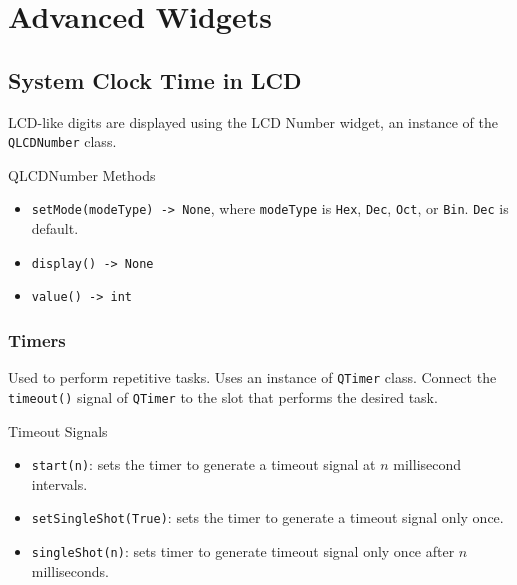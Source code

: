 \documentclass[notes.tex]{subfiles}
\begin{document}
	\chapter{Advanced Widgets}
		\section{System Clock Time in LCD}
			LCD-like digits are displayed using the LCD Number widget, an instance of the \verb|QLCDNumber| class.
			\begin{sidenote}{QLCDNumber Methods}
				\begin{itemize}[nosep]
					\item \verb|setMode(modeType) -> None|, where \verb|modeType| is \verb|Hex|, \verb|Dec|, \verb|Oct|, or \verb|Bin|. \verb|Dec| is default.
					\item \verb|display() -> None|
					\item \verb|value() -> int|
				\end{itemize}
			\end{sidenote}

			\subsection{Timers}
				Used to perform repetitive tasks. Uses an instance of \verb|QTimer| class. Connect the \verb|timeout()| signal of \verb|QTimer| to the slot that performs the desired task.
				\begin{sidenote}{Timeout Signals}
					\begin{itemize}[nosep]
						\item \verb|start(n)|: sets the timer to generate a timeout signal at $n$ millisecond intervals.
						\item \verb|setSingleShot(True)|: sets the timer to generate a timeout signal only once.
						\item \verb|singleShot(n)|: sets timer to generate timeout signal only once after $n$ milliseconds.
					\end{itemize}
				\end{sidenote}
\end{document}
